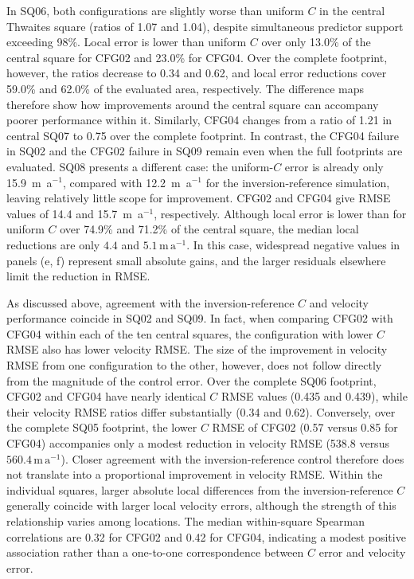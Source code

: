 \documentclass[review,jog]{igs}
\begin{document}
In SQ06, both configurations are slightly worse than uniform $C$ in the
central Thwaites square (ratios of 1.07 and 1.04), despite simultaneous
predictor support exceeding 98\%. Local error is lower than uniform $C$
over only 13.0\% of the central square for CFG02 and 23.0\% for CFG04.
Over the complete footprint, however, the ratios decrease to 0.34 and
0.62, and local error reductions cover 59.0\% and 62.0\% of the evaluated
area, respectively. The difference maps therefore show how improvements
around the central square can accompany poorer performance within it.
Similarly, CFG04 changes from a ratio of 1.21 in central SQ07 to 0.75
over the complete footprint. In contrast, the CFG04 failure in SQ02
and the CFG02 failure in SQ09 remain even when the full footprints
are evaluated. SQ08 presents a different case: the uniform-$C$ error is already only 15.9~m~a$^{-1}$, compared with 12.2~m~a$^{-1}$ for the inversion-reference simulation, leaving relatively little scope for improvement. CFG02 and CFG04 give RMSE values of 14.4 and 15.7~m~a$^{-1}$, respectively. Although local error is lower than for uniform $C$ over 74.9\% and 71.2\% of the central square, the median local reductions are only $4.4$ and $5.1\,\mathrm{m\,a^{-1}}$. In this case, widespread negative values in panels (e, f) represent small absolute gains, and the larger residuals elsewhere limit the reduction in RMSE.

As discussed above, agreement with the inversion-reference $C$ and velocity performance coincide in SQ02 and SQ09. In fact, when comparing CFG02 with CFG04 within each of the ten central squares, the configuration with lower $C$ RMSE also has lower velocity RMSE. The size of the improvement in velocity RMSE from one configuration to the other, however, does not follow directly from the magnitude of the control error. Over
the complete SQ06 footprint, CFG02 and CFG04 have nearly identical
$C$ RMSE values (0.435 and 0.439), while their velocity RMSE ratios
differ substantially (0.34 and 0.62). Conversely, over the complete
SQ05 footprint, the lower $C$ RMSE of CFG02 (0.57 versus 0.85 for
CFG04) accompanies only a modest reduction in velocity RMSE
(538.8 versus $560.4\,\mathrm{m\,a^{-1}}$). Closer agreement with
the inversion-reference control therefore does not translate into a
proportional improvement in velocity RMSE. Within the individual
squares, larger absolute local differences from the inversion-reference $C$ generally coincide with larger local velocity errors, although the strength of this relationship varies among locations. The median within-square Spearman correlations are 0.32 for CFG02 and 0.42 for CFG04, indicating a modest positive association rather than a one-to-one correspondence between $C$ error and velocity error.
\end{document}
